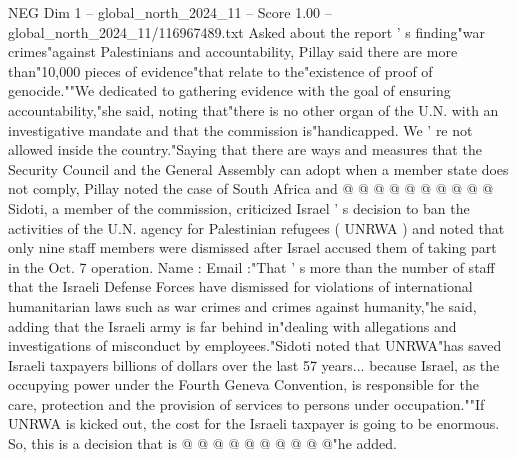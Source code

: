 \begin{textsample}{NEG Dim 1 – global\_north\_2024\_11 – Score 1.00 – global\_north\_2024\_11/116967489.txt}
Asked about the report ' s finding"war crimes"against Palestinians and accountability, Pillay said there are more than"10,000 pieces of evidence"that relate to the"existence of proof of genocide.""We dedicated to gathering evidence with the goal of ensuring accountability,"she said, noting that"there is no other organ of the U.N. with an investigative mandate and that the commission is"handicapped.
We ' re not allowed inside the country."Saying that there are ways and measures that the Security Council and the General Assembly can adopt when a member state does not comply, Pillay noted the case of South Africa and @ @ @ @ @ @ @ @ @ @ Sidoti, a member of the commission, criticized Israel ' s decision to ban the activities of the U.N. agency for Palestinian refugees ( UNRWA ) and noted that only nine staff members were dismissed after Israel accused them of taking part in the Oct. 7 operation.
Name : Email :"That ' s more than the number of staff that the Israeli Defense Forces have dismissed for violations of international humanitarian laws such as war crimes and crimes against humanity,"he said, adding that the Israeli army is far behind in"dealing with allegations and investigations of misconduct by employees."Sidoti noted that UNRWA"has saved Israeli taxpayers billions of dollars over the last 57 years... because Israel, as the occupying power under the Fourth Geneva Convention, is responsible for the care, protection and the provision of services to persons under occupation.""If UNRWA is kicked out, the cost for the Israeli taxpayer is going to be enormous.
So, this is a decision that is @ @ @ @ @ @ @ @ @ @"he added.

\end{textsample}
